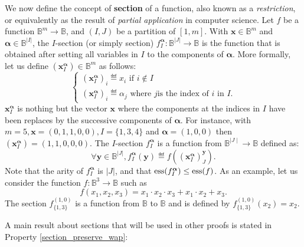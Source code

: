 We now define the concept of \textbf{section} of a function, also known as a
\textit{restriction}, or equivalently as the result of \textit{partial
application} in computer science. Let $f$ be a function $\mathbb{B}^m\to
\mathbb{B}$, and $(I, J)$ be a partition of $[1, m]$. With $\mathbf{x} \in
\mathbb{B}^m$ and $\boldsymbol{\alpha} \in \mathbb{B}^{|I|}$, the $I$-section
(or simply section) $f^{\boldsymbol{\alpha}}_I \colon \mathbb{B}^{|J|} \to
\mathbb{B}$ is the function that is obtained after setting all variables in $I$
to the components of $\boldsymbol{\alpha}$.  More formally, let us define
$(\mathbf{x}^{\boldsymbol{\alpha}}_I) \in \mathbb{B}^m$ as follows:
$$
\begin{cases}
(\mathbf{x}^{\boldsymbol{\alpha}}_I)_i \eqdef x_i \mbox{ if } i \notin I\\
(\mathbf{x}^{\boldsymbol{\alpha}}_I)_i \eqdef \alpha_j \mbox{ where } j \mbox{
  is the index of } i \mbox{ in } I.
\end{cases}
$$
$\mathbf{x}^{\boldsymbol{\alpha}}_I$ is nothing but the vector $\mathbf{x}$
where the components at the  indices in $I$ have been replaces by the
successive components of $\boldsymbol{\alpha}$. For instance, with $m=5,
\mathbf{x}=(0,1,1,0,0), I=\{1,3,4\}$ and $\boldsymbol{\alpha}=(1,0,0)$ then
$(\mathbf{x}^{\boldsymbol{\alpha}}_I)=(1,1,0,0,0)$.  The $I$-section
$f^{\boldsymbol{\alpha}}_I$ is a function from $\mathbb{B}^{\mid J \mid} \to
\mathbb{B}$ defined as:
$$\forall \mathbf{y} \in \mathbb{B}^{|J|},
f^{\boldsymbol{\alpha}}_I(\mathbf{y}) \eqdef
f((\mathbf{x}^{\boldsymbol{\alpha}}_I)^\mathbf{y}_J).$$
Note that the arity of $f^{\boldsymbol{\alpha}}_I$ is $|J|$, and that
$\operatorname{ess}(f^{\boldsymbol{\alpha}}_I) \leq \operatorname{ess}(f)$.  As an example, let us consider
the function $f\colon \mathbb{B}^3 \to \mathbb{B}$ such as
$$f(x_1,x_2, x_3) = x_1 \cdot x_2 \cdot x_3 + x_1 \cdot x_2 + x_3.$$
The section $f^{(1, 0)}_{\{1, 3\}}$ is a function from $\mathbb{B}$ to
$\mathbb{B}$ and is defined by $f^{(1, 0)}_{\{1, 3\}}(x_2) = x_2$.

A main result about sections that will be used in other proofs is stated in
Property \ref{section_preserve_wap}:

